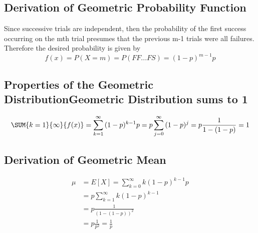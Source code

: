 \documentclass[10pt,]{book}
\theoremstyle{plain}
\theoremstyle{definition}
\theoremstyle{definition}
\theoremstyle{definition}
\numberwithin{equation}{section}
\begin{document}
\subsection[Derivation of Geometric Probability Function]{Derivation of Geometric Probability Function}\label{subsection-19}
 Since successive trials are independent, then the probability 
			of the first success occurring on the mth trial presumes that
			the previous m-1 trials were all failures.  Therefore the 
			desired probability is given by %
\begin{equation*}f(x) = P(X=m) = P(FF...FS) = (1-p)^{m-1}p\end{equation*}\typeout{************************************************}
\typeout{************************************************}
\subsection[Properties of the Geometric DistributionGeometric Distribution sums to 1]{Properties of the Geometric DistributionGeometric Distribution sums to 1}\label{subsection-20}
\begin{gather*}
\SUM {k=1} {\infty} {f(x)} = \sum_{k=1}^{\infty} {(1-p)^{k-1} p} = p \sum_{j=0}^{\infty} {(1-p)^j} = p \frac{1}{1-(1-p)} = 1
\end{gather*}\typeout{************************************************}
\typeout{************************************************}
\subsection[Derivation of Geometric Mean]{Derivation of Geometric Mean}\label{subsection-21}
\begin{align*}
\mu & = E[X] = \sum_{k=0}^{\infty} {k(1-p)^{k-1}p}\\
 & = p \sum_{k=1}^{\infty} {k(1-p)^{k-1}}\\
 & = p \frac{1}{(1-(1-p))^2}\\
 & = p \frac{1}{p^2} = \frac{1}{p}
\end{align*}\typeout{************************************************}
\typeout{************************************************}
\end{document}
